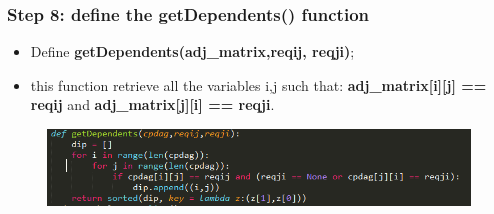 \documentclass[xcolor ={table,usenames,dvipsnames}]{beamer}
\theoremstyle{definition}
\begin{document}
\begin{frame}
\frametitle{Step 8: define the getDependents() function}
\begin{itemize}
	\item Define \textbf{getDependents(adj\_matrix,reqij, reqji)};
	\item this function retrieve all the variables i,j such that: \textbf{adj\_matrix[i][j] == reqij} and \textbf{adj\_matrix[j][i] == reqji}.
\end{itemize}
	\begin{figure}[h!]
		\centering
		\includegraphics[scale=0.57]{img/getindep.PNG}
		\label{Interfacce di un CS}
	\end{figure}
\end{frame}
\end{document}
